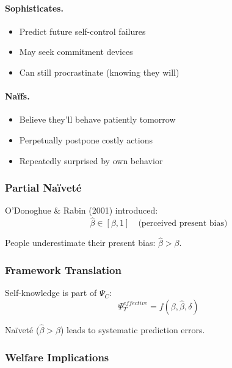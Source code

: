 \paragraph{Sophisticates.}
\begin{itemize}
    \item Predict future self-control failures
    \item May seek commitment devices
    \item Can still procrastinate (knowing they will)
\end{itemize}

\paragraph{Naïfs.}
\begin{itemize}
    \item Believe they'll behave patiently tomorrow
    \item Perpetually postpone costly actions
    \item Repeatedly surprised by own behavior
\end{itemize}

\subsubsection{Partial Naïveté}

O'Donoghue \& Rabin (2001) introduced:
\begin{equation}
\hat{\beta} \in [\beta, 1] \quad \text{(perceived present bias)}
\end{equation}

People underestimate their present bias: $\hat{\beta} > \beta$.

\subsubsection{Framework Translation}

Self-knowledge is part of $\Psi_C$:
\begin{equation}
\Psi_T^{effective} = f(\beta, \hat{\beta}, \delta)
\end{equation}

Naïveté ($\hat{\beta} > \beta$) leads to systematic prediction errors.

\subsubsection{Welfare Implications}

